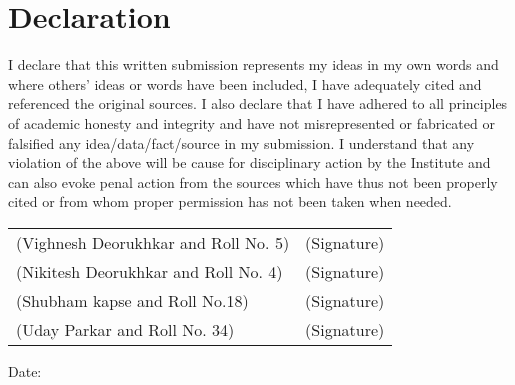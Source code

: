 \chapter*{Declaration}
\thispagestyle{empty}

I declare that this written submission represents my ideas in my own words and where others' ideas or words have been included, I have adequately cited and referenced the original sources. I also declare that I have adhered to all principles of academic honesty and integrity and have not misrepresented or fabricated or falsified any idea/data/fact/source in my submission. I understand that any violation of the above will be cause for disciplinary action by the Institute and can also evoke penal action from the sources which have thus not been properly cited or from whom proper permission has not been taken when needed.

\vspace{2cm}
\begin{tabularx}{\textwidth}{X X}
    (Vighnesh Deorukhkar and Roll No. 5) & (Signature) \hrulefill \\
    \vspace{1cm}
    (Nikitesh Deorukhkar and Roll No. 4) & (Signature) \hrulefill \\
    \vspace{1cm}
    (Shubham kapse and Roll No.18) & (Signature) \hrulefill \\
    \vspace{1cm}
    (Uday Parkar and Roll No. 34) & (Signature) \hrulefill \\
\end{tabularx}

\vspace{1cm}
Date: \hrulefill